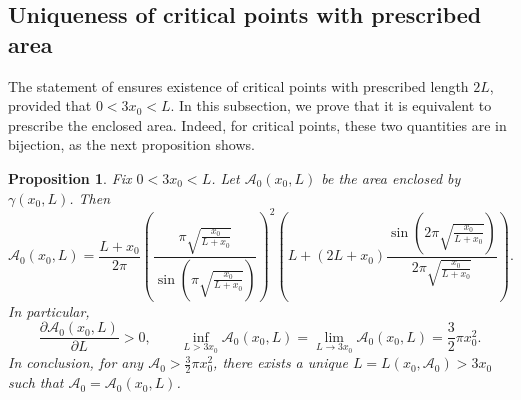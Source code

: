 \documentclass[11pt]{amsart}
\newcommand{\A}{\mathcal A}
\newtheorem{proposition}[theorem]{Proposition}
\theoremstyle{definition}
\theoremstyle{remark}
\numberwithin{equation}{section}
\begin{document}
\subsection{Uniqueness of critical points with prescribed area}\label{sec_prescribedvolume}
The statement of  ensures existence of critical points with prescribed length $2L$, provided that $0<3x_0<L$. In this subsection, we prove that it is equivalent to prescribe the enclosed area. Indeed, for critical points, these two quantities are in bijection, as the next proposition shows.
\begin{proposition}\label{volbijlength}
Fix $0<3x_0<L$. Let $\A_0(x_0,L)$ be the area enclosed by $\gamma(x_0,L)$.   Then
\begin{equation}\label{volumeofcriticalpointsinstatement}
	\A_0(x_0,L)=\frac{ L+x_0 }{2\pi}\left(\frac{\pi\sqrt{\frac{x_0}{ L+x_0 }}}{\sin\left(\pi\sqrt{\frac{x_0}{ L+x_0 }}\right)}\right)^2\left( L+(2 L+x_0 )\frac{\sin\left(2\pi\sqrt{\frac{x_0}{ L+x_0 }}\right)}{2\pi\sqrt{\frac{x_0}{ L+x_0 }}}\right).
\end{equation}
In particular, 
\begin{equation*}
	\frac{\partial \A_0(x_0,L)}{\partial L}>0, \qquad\inf_{L>3x_0}\A_0(x_0,L)=\lim_{L\to 3x_0}\A_0(x_0,L)=\frac{3}{2}\pi x_0^2.
\end{equation*}
In conclusion, for any $\A_0>\frac{3}{2}\pi x_0^2$, there exists a unique $L=L(x_0,\A_0)>3x_0$ such that $\A_0=\A_0(x_0,L)$.
\end{proposition}
\end{document}
